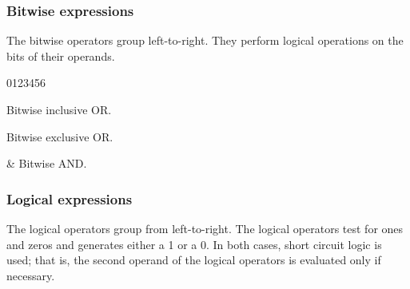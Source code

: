 \subsubsection{Bitwise expressions}
\label{sec:BitwiseExpression}

The bitwise operators group left-to-right. They perform logical
operations on the  bits of their operands.

\begin{production}
\end{production}


\begin{production}
\begin{Ventry3}{0123456}
\item[\T{|}]  Bitwise inclusive OR.
\item[\circumflex] Bitwise exclusive OR.
\item[\&] Bitwise AND.
\end{Ventry3}
\end{production}

\subsubsection{Logical expressions}
\label{sec:LogicalExpression}

The logical operators group from left-to-right. The logical operators
test for ones and zeros and generates either a 1 or a 0. In both cases,
short circuit logic is used; that is, the second operand of the
logical operators is evaluated only if necessary.

\begin{production}
\end{production}

